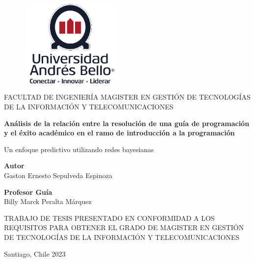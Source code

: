 \begin{titlepage}
    \begin{figure}[h]
        \centering
        \includegraphics[width=2.06111in,height=1.68611in]{img/image1.png}
    \end{figure}
    \begin{center}
        \vspace*{0.5cm}
        \LARGE
        FACULTAD DE INGENIERÍA
        MAGISTER EN GESTIÓN DE TECNOLOGÍAS DE LA INFORMACIÓN Y TELECOMUNICACIONES
        \vfill
        
        \Huge
        \textbf{Análisis de la relación entre la resolución de una guía de programación y el éxito académico en el ramo de introducción a la programación}
        \vfill

        \LARGE
        Un enfoque predictivo utilizando redes bayesianas        
        \vfill

        \textbf{Autor}\\
        Gaston Ernesto Sepulveda Espinoza
        \vfill

        \textbf{Profesor Guía}\\
        Billy Marck Peralta Márquez
        \vfill
        \begin{flushright}
            TRABAJO DE TESIS PRESENTADO EN CONFORMIDAD 
            A LOS REQUISITOS PARA OBTENER EL GRADO DE 
            MAGISTER EN GESTIÓN DE TECNOLOGÍAS DE LA INFORMACIÓN Y TELECOMUNICACIONES
        \end{flushright}
        \vfill

        \Large
        Santiago, Chile 2023         
        \vfill
    \end{center}
\end{titlepage}